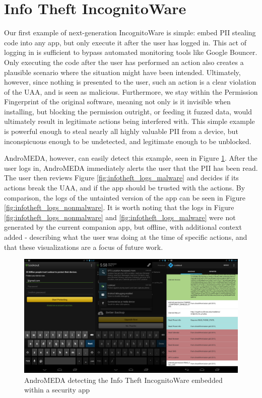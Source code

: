 \section{Info Theft IncognitoWare}
Our first example of next-generation IncognitoWare is simple: embed PII stealing code into any app, but only execute it after the user has logged in. This act of logging in is sufficient to bypass automated monitoring tools like Google Bouncer. Only executing the code after the user has performed an action also creates a plausible scenario where the situation might have been intended. Ultimately, however, since nothing is presented to the user, such an action is a clear violation of the UAA, and is seen as malicious. Furthermore, we stay within the Permission Fingerprint of the original software, meaning not only is it invisible when installing, but blocking the permission outright, or feeding it fuzzed data, would ultimately result in legitimate actions being interfered with. This simple example is powerful enough to steal nearly all highly valuable PII from a device, but inconspicuous enough to be undetected, and legitimate enough to be unblocked.

AndroMEDA, however, can easily detect this example, seen in Figure \ref{fig:infotheft_visual}. After the user logs in, AndroMEDA immediately alerts the user that the PII has been read. The user then reviews Figure \ref{fig:infotheft_logs_malware} and decides if its actions break the UAA, and if the app should be trusted with the actions. By comparison, the logs of the untainted version of the app can be seen in Figure \ref{fig:infotheft_logs_nonmalware}. It is worth noting that the logs in Figure \ref{fig:infotheft_logs_nonmalware} and \ref{fig:infotheft_logs_malware} were not generated by the current companion app, but offline, with additional context added - describing what the user was doing at the time of specific actions, and that these visualizations are a focus of future work.

\begin{figure}[h]
\begin{center}
\includegraphics[width=1.0\columnwidth]{figs/lookout_detection}
\caption{AndroMEDA detecting the Info Theft IncognitoWare embedded within a security app }
\label{fig:infotheft_visual}
\end{center}
\end{figure}

